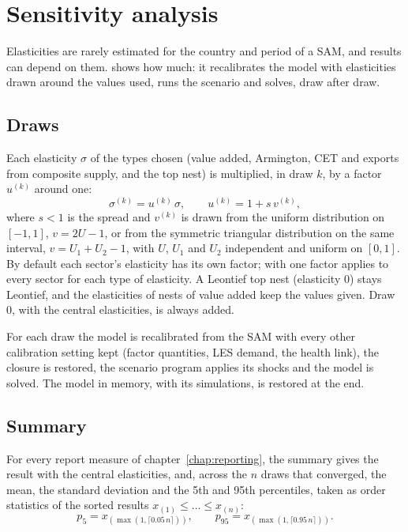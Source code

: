 \chapter{Sensitivity analysis}\label{chap:sensitivity}

Elasticities are rarely estimated for the country and period of a SAM, and
results can depend on them.  shows how much: it
recalibrates the model with elasticities drawn around the values used, runs
the scenario and solves, draw after draw.

\section{Draws}

Each elasticity $\sigma$ of the types chosen (value added, Armington, CET and
exports from composite supply, and the top nest) is multiplied, in draw $k$, by
a factor $u^{(k)}$ around one:
\begin{equation*}
\sigma^{(k)} = u^{(k)}\,\sigma, \qquad u^{(k)} = 1 + s\,v^{(k)},
\end{equation*}
where $s < 1$ is the spread and $v^{(k)}$ is drawn from the uniform distribution
on $[-1, 1]$, $v = 2U - 1$, or from the symmetric triangular distribution on the
same interval, $v = U_1 + U_2 - 1$, with $U$, $U_1$ and $U_2$ independent and
uniform on $[0, 1]$. By default each sector's elasticity has its own factor;
with  one factor applies to every sector for each type of
elasticity. A Leontief top nest (elasticity 0) stays Leontief, and the
elasticities of nests of value added keep the values given. Draw 0, with the
central elasticities, is always added.

For each draw the model is recalibrated from the SAM with every other
calibration setting kept (factor quantities, LES demand, the health link), the
closure is restored, the scenario program applies its shocks and the model is
solved. The model in memory, with its simulations, is restored at the end.

\section{Summary}

For every report measure of chapter~\ref{chap:reporting}, the summary gives the
result with the central elasticities, and, across the $n$ draws that
converged, the mean, the standard deviation and the 5th and 95th percentiles,
taken as order statistics of the sorted results $x_{(1)} \le \dots \le
x_{(n)}$:
\begin{equation*}
p_{5} = x_{(\max(1, \lceil 0.05\,n \rceil))}, \qquad
p_{95} = x_{(\max(1, \lceil 0.95\,n \rceil))}.
\end{equation*}

